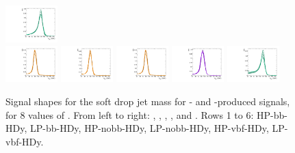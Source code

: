 \begin{figure}[htbp]
  \includegraphics[width=0.18\textwidth]{fig/2Dfit/templateSignalVsMX_fromDC_WprToWH_MJJ_mu_HP_vbf_HDy.pdf}\\
  \includegraphics[width=0.18\textwidth]{fig/2Dfit/templateSignalVsMX_fromDC_GbuToWW_MJJ_mu_LP_vbf_HDy.pdf}
  \includegraphics[width=0.18\textwidth]{fig/2Dfit/templateSignalVsMX_fromDC_RadToWW_MJJ_mu_LP_vbf_HDy.pdf}
  \includegraphics[width=0.18\textwidth]{fig/2Dfit/templateSignalVsMX_fromDC_ZprToWW_MJJ_mu_LP_vbf_HDy.pdf}
  \includegraphics[width=0.18\textwidth]{fig/2Dfit/templateSignalVsMX_fromDC_WprToWZ_MJJ_mu_LP_vbf_HDy.pdf}
  \includegraphics[width=0.18\textwidth]{fig/2Dfit/templateSignalVsMX_fromDC_WprToWH_MJJ_mu_LP_vbf_HDy.pdf}\\
  \caption{
    Signal shapes for the soft drop jet mass \MJ for \ggF- and \DY-produced signals, for 8 values of \MX.
    From left to right: \GBulktoWW, \RadtoWW, \ZprtoWW, \WprtoWZ, and \WprtoWH.
    Rows 1 to 6: HP-bb-HDy, LP-bb-HDy, HP-nobb-HDy, LP-nobb-HDy, HP-vbf-HDy, LP-vbf-HDy.
  }
  \label{fig:MJJShapes_NonVBF_HDy_Run2}
\end{figure}


